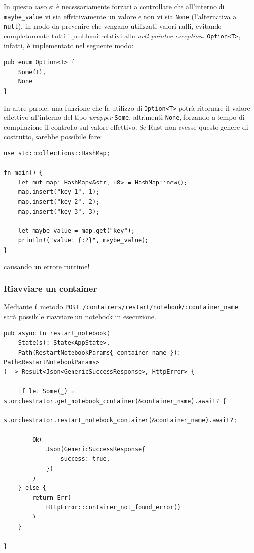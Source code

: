 In questo caso si è necessariamente forzati a controllare che all'interno di \verb|maybe_value| vi sia effettivamente un valore e non vi sia \verb|None| (l'alternativa a \verb|null|), in modo da prevenire che vengano utilizzati valori nulli, evitando completamente tutti i problemi relativi alle \textit{null-pointer exception}.
\newline
\verb|Option<T>|, infatti, è implementato nel seguente modo:
\begin{verbatim}
pub enum Option<T> {
    Some(T),
    None
}
\end{verbatim}
In altre parole, una funzione che fa utilizzo di \verb|Option<T>| potrà ritornare il valore effettivo all'interno del tipo \textit{wrapper} \verb|Some|, altrimenti \verb|None|, forzando a tempo di compilazione il controllo sul valore effettivo.\newline
Se Rust non avesse questo genere di costrutto, sarebbe possibile fare:
\begin{verbatim}
use std::collections::HashMap;

fn main() {
    let mut map: HashMap<&str, u8> = HashMap::new();
    map.insert("key-1", 1);
    map.insert("key-2", 2);
    map.insert("key-3", 3);

    let maybe_value = map.get("key");
    println!("value: {:?}", maybe_value);
}
\end{verbatim}
causando un errore runtime!
\subsubsection{Riavviare un container}
Mediante il metodo \verb|POST /containers/restart/notebook/:container_name| sarà possibile riavviare un notebook in esecuzione.
\begin{verbatim}
pub async fn restart_notebook(
    State(s): State<AppState>,
    Path(RestartNotebookParams{ container_name }): Path<RestartNotebookParams>
) -> Result<Json<GenericSuccessResponse>, HttpError> {

    if let Some(_) = s.orchestrator.get_notebook_container(&container_name).await? {
        s.orchestrator.restart_notebook_container(&container_name).await?;

        Ok(
            Json(GenericSuccessResponse{
                success: true,
            })
        )
    } else {
        return Err(
            HttpError::container_not_found_error()
        )
    }

}

\end{verbatim}

